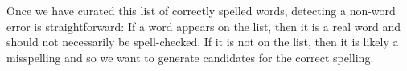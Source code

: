 Once we have curated this list of correctly spelled words, detecting a
non-word error is straightforward: If a word appears on the list, then
it is a real word and should not necessarily be spell-checked.  If it
is not on the list, then it is likely a misspelling and so we want to
generate candidates for the correct spelling.







